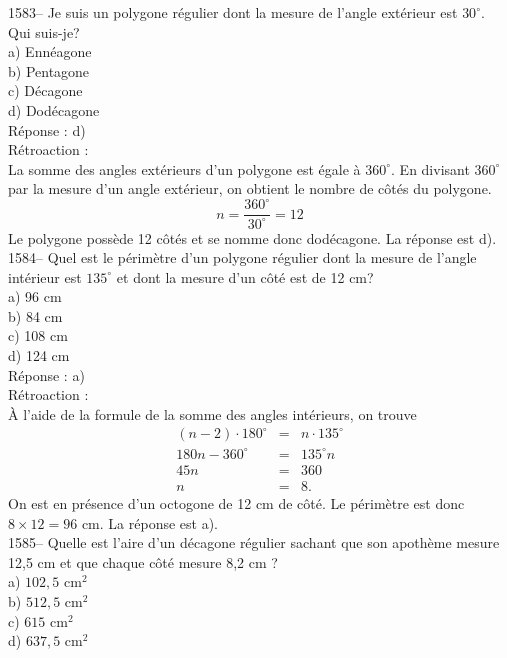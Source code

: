 1583-- Je suis un polygone r\'egulier dont la mesure de l'angle
ext\'erieur est
$30^{\circ}$. Qui suis-je?\\
a) Enn\'eagone\\
b) Pentagone \\
c) D\'ecagone\\
d) Dod\'ecagone\\

R\'eponse : d)\\

R\'etroaction :\\
La somme des angles ext\'erieurs d'un polygone est \'egale \`a
$360^{\circ}$. En divisant $360^{\circ}$ par la mesure d'un angle
ext\'erieur, on obtient le nombre de c\^ot\'es du polygone.
$$n=\frac{360^{\circ}}{30^{\circ}}=12$$ Le polygone poss\`ede 12
c\^ot\'es et se nomme donc dod\'ecagone. La r\'eponse est d).\\

1584-- Quel est le p\'erim\`etre d'un polygone r\'egulier dont la
mesure de l'angle int\'erieur est $135^{\circ}$ et dont la mesure
d'un c\^ot\'e est de 12 cm?\\
a) 96 cm\\
b) 84 cm\\
c) 108 cm\\
d) 124 cm\\

R\'eponse : a)\\

R\'etroaction :\\
\`A l'aide de la formule de la somme des angles int\'erieurs, on
trouve
\begin{eqnarray*}
(n-2)\cdot180^{\circ}&=&n\cdot135^{\circ} \\ 180n-360^{\circ}&=&135^{\circ}n
\\
45n&=&360 \\ n&=&8.
\end{eqnarray*}
On est en pr\'esence d'un octogone de 12 cm de c\^ot\'e. Le
p\'erim\`etre est donc $8\times12=96${\textrm{ cm}}. La r\'eponse est a).\\

1585-- Quelle est l'aire d'un d\'ecagone r\'egulier sachant que son
apoth\`eme mesure 12,5 cm et que chaque c\^ot\'e mesure 8,2 cm
?\\
a) $102,5{\textrm{ cm}}^2$\\
b) $512,5{\textrm{ cm}}^2$\\
c) $615{\textrm{ cm}}^2$\\
d) $637,5{\textrm{ cm}}^2$\\

